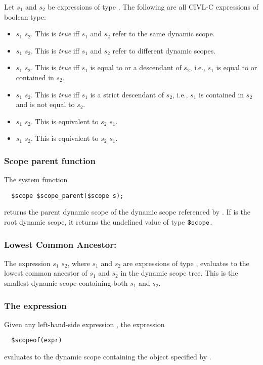 Let $s_1$ and $s_2$ be expressions of type \cscope.  The following are
all CIVL-C expressions of boolean type:
\begin{itemize}
\item $s_1$ \ct{==} $s_2$.  This is \emph{true} iff $s_1$ and $s_2$
  refer to the same dynamic scope.
\item  $s_1$ \ct{!=} $s_2$.  This is \emph{true} iff $s_1$ and $s_2$
  refer to different dynamic scopes.
\item  $s_1$ \ct{<=} $s_2$.  This is \emph{true} iff $s_1$ is equal to
  or a descendant of $s_2$, i.e., $s_1$ is equal to or contained in $s_2$.
\item  $s_1$ \ct{<} $s_2$.  This is \emph{true} iff $s_1$ is a strict 
  descendant of $s_2$, i.e., $s_1$ is contained in $s_2$ and is not
  equal to $s_2$.
\item $s_1$ \ct{>} $s_2$.  This is equivalent to $s_2$ \ct{<} $s_1$.
\item  $s_1$ \ct{>=} $s_2$.  This is equivalent to $s_2$ \ct{<=} $s_1$.
\end{itemize}

\subsubsection{Scope parent function \texorpdfstring{\cscopeparent}{\$scope\_parent}}

The system function
\begin{verbatim}
  $scope $scope_parent($scope s);
\end{verbatim}
returns the parent dynamic scope of the dynamic scope referenced by
.  If  is the root dynamic scope, it returns the undefined
value of type $\mbox{\texttt{\${}scope}}$.

\subsubsection{Lowest Common Ancestor: \ct{+}}

The expression $s_1$ \ct{+} $s_2$, where $s_1$ and $s_2$ are
expressions of type \cscope, evaluates to the lowest common ancestor
of $s_1$ and $s_2$ in the dynamic scope tree. This is the smallest
dynamic scope containing both $s_1$ and $s_2$.

\subsubsection{The \cscopeof{} expression}

Given any left-hand-side expression , the expression
\begin{verbatim}
  $scopeof(expr)
\end{verbatim}
evaluates to the dynamic scope containing the object specified by
.

